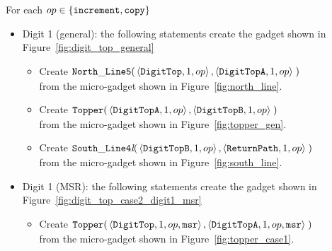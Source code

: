 For each $op \in \{ {\tt increment, copy } \}$
    \begin{itemize}

        \item Digit 1 (general): the following statements create the gadget shown in Figure~\ref{fig:digit_top_general}
        \begin{itemize}
            \item Create
            $\begin{aligned}[t]
                {\tt North\_Line5}(& \left \langle {\tt DigitTop},  1, op \right\rangle,
                                     \left \langle {\tt DigitTopA}, 1, op \right\rangle \;)
            \end{aligned}$\\from the micro-gadget shown in Figure~\ref{fig:north_line}.

            \item Create
            $\begin{aligned}[t]
                {\tt Topper}(& \left \langle {\tt DigitTopA}, 1, op \right\rangle,
                               \left \langle {\tt DigitTopB}, 1, op \right\rangle \;)
            \end{aligned}$\\from the micro-gadget shown in Figure~\ref{fig:topper_gen}.

            \item Create
            $\begin{aligned}[t]
                {\tt South\_Line4\textit{l}}(& \left\langle {\tt DigitTopB}, 1, op \right\rangle,
                                               \left\langle {\tt ReturnPath},     1, op \right\rangle \;)
            \end{aligned}$\\from the micro-gadget shown in Figure~\ref{fig:south_line}.
        \end{itemize}
        \vspace{1cm}

        \item Digit 1 (MSR): the following statements create the gadget shown in Figure~\ref{fig:digit_top_case2_digit1_msr}
        \begin{itemize}
            \item Create
            $\begin{aligned}[t]
                {\tt Topper}(& \left\langle {\tt DigitTop},  1, op, {\tt msr} \right\rangle,
                               \left\langle {\tt DigitTopA}, 1, op, {\tt msr} \right\rangle \;)
            \end{aligned}$ \\ from the micro-gadget shown in Figure~\ref{fig:topper_case1}.



\end{itemize}
\end{itemize}
